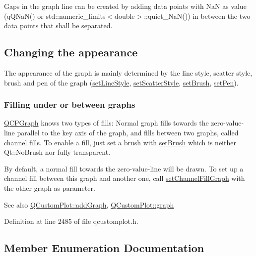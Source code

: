 Gaps in the graph line can be created by adding data points with NaN as value ({\ttfamily q\+Q\+Na\+N()} or {\ttfamily std\+::numeric\+\_\+limits$<$double$>$\+::quiet\+\_\+\+Na\+N()}) in between the two data points that shall be separated.\hypertarget{class_q_c_p_statistical_box_appearance}{}\subsection{Changing the appearance}\label{class_q_c_p_statistical_box_appearance}
The appearance of the graph is mainly determined by the line style, scatter style, brush and pen of the graph (\hyperlink{class_q_c_p_graph_a513fecccff5b2a50ce53f665338c60ff}{set\+Line\+Style}, \hyperlink{class_q_c_p_graph_a12bd17a8ba21983163ec5d8f42a9fea5}{set\+Scatter\+Style}, \hyperlink{class_q_c_p_abstract_plottable_a7a4b92144dca6453a1f0f210e27edc74}{set\+Brush}, \hyperlink{class_q_c_p_abstract_plottable_ab74b09ae4c0e7e13142fe4b5bf46cac7}{set\+Pen}).\hypertarget{class_q_c_p_graph_filling}{}\subsubsection{Filling under or between graphs}\label{class_q_c_p_graph_filling}
\hyperlink{class_q_c_p_graph}{Q\+C\+P\+Graph} knows two types of fills\+: Normal graph fills towards the zero-\/value-\/line parallel to the key axis of the graph, and fills between two graphs, called channel fills. To enable a fill, just set a brush with \hyperlink{class_q_c_p_abstract_plottable_a7a4b92144dca6453a1f0f210e27edc74}{set\+Brush} which is neither Qt\+::\+No\+Brush nor fully transparent.

By default, a normal fill towards the zero-\/value-\/line will be drawn. To set up a channel fill between this graph and another one, call \hyperlink{class_q_c_p_graph_a2d03156df1b64037a2e36cfa50351ca3}{set\+Channel\+Fill\+Graph} with the other graph as parameter.

\begin{DoxySeeAlso}{See also}
\hyperlink{class_q_custom_plot_a6fb2873d35a8a8089842d81a70a54167}{Q\+Custom\+Plot\+::add\+Graph}, \hyperlink{class_q_custom_plot_a6ecae130f684b25276fb47bd3a5875c6}{Q\+Custom\+Plot\+::graph} 
\end{DoxySeeAlso}


Definition at line 2485 of file qcustomplot.\+h.



\subsection{Member Enumeration Documentation}
\mbox{\label{class_q_c_p_graph_ad23b514404bd2cb3216f57c90904d6af}} 
